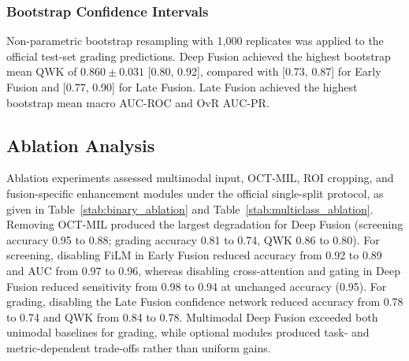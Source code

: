 \documentclass[sn-mathphys]{sn-jnl}%
\theoremstyle{thmstyleone}%
\theoremstyle{thmstyletwo}%
\theoremstyle{thmstylethree}%
\begin{document}
\subsubsection{Bootstrap Confidence Intervals}
\label{subsubsec:grading_bootstrap}

Non-parametric bootstrap resampling with 1,000 replicates was applied to the official test-set grading predictions. %
Deep Fusion achieved the highest bootstrap mean QWK of $0.860\pm0.031$ [0.80, 0.92], compared with [0.73, 0.87] for Early Fusion and [0.77, 0.90] for Late Fusion. Late Fusion achieved the highest bootstrap mean macro AUC-ROC and OvR AUC-PR.

\subsection{Ablation Analysis}
\label{subsec:ablation_results}

Ablation experiments assessed multimodal input, OCT-MIL, ROI cropping, and fusion-specific enhancement modules under the official single-split protocol, as given in Table~\ref{stab:binary_ablation} and Table~\ref{stab:multiclass_ablation}. Removing OCT-MIL produced the largest degradation for Deep Fusion (screening accuracy 0.95 to 0.88; grading accuracy 0.81 to 0.74, QWK 0.86 to 0.80). For screening, disabling FiLM in Early Fusion reduced accuracy from 0.92 to 0.89 and AUC from 0.97 to 0.96, whereas disabling cross-attention and gating in Deep Fusion reduced sensitivity from 0.98 to 0.94 at unchanged accuracy (0.95). For grading, disabling the Late Fusion confidence network reduced accuracy from 0.78 to 0.74 and QWK from 0.84 to 0.78. Multimodal Deep Fusion exceeded both unimodal baselines for grading, while optional modules produced task- and metric-dependent trade-offs rather than uniform gains.
\end{document}
